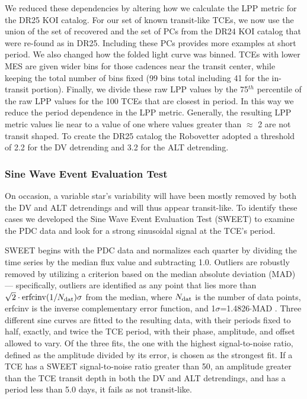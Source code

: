We reduced these dependencies by altering how we calculate the LPP metric for the DR25 KOI catalog. For our set of known transit-like TCEs, we now use the union of the set of recovered  and the set of PCs from the DR24 KOI catalog \citep{Coughlin2016} that were re-found as  in DR25. Including these PCs provides more examples at short period. We also changed how the folded light curve was binned. TCEs with lower MES are given wider bins for those cadences near the transit center, while keeping the total number of bins fixed (99 bins total including 41 for the in-transit portion). Finally, we divide these raw LPP values by the 75$^{th}$ percentile of the raw LPP values for the 100 TCEs that are closest in period.  In this way we reduce the period dependence in the LPP metric.  Generally, the resulting LPP metric values lie near to a value of one where values greater than $\approx$ 2 are not transit shaped.  To create the DR25 catalog the Robovetter adopted a threshold of 2.2 for the DV detrending and 3.2 for the ALT detrending.





\subsubsection{Sine Wave Event Evaluation Test}
\label{s:sweetntl}

On occasion, a variable star's variability will have been mostly removed by both the DV and ALT detrendings and will thus appear transit-like. To identify these cases we developed the Sine Wave Event Evaluation Test (SWEET) to examine the PDC data and look for a strong sinusoidal signal at the TCE's period. 

SWEET begins with the PDC data and normalizes each quarter by dividing the time series by the median flux value and subtracting 1.0. Outliers are robustly removed by utilizing a criterion based on the median absolute deviation (MAD) --- specifically, outliers are identified as any point that lies more than $\sqrt{2}\cdot\mathrm{erfcinv}(1/N_{\rm dat})\sigma$ from the median, where $N_{\rm dat}$ is the number of data points, erfcinv is the inverse complementary error function, and 1$\sigma$=1.4826$\cdot$MAD \citep[see][]{Hampel1974,Ruppert2010}. Three different sine curves are fitted to the resulting data, with their periods fixed to half, exactly, and twice the TCE period, with their phase, amplitude, and offset allowed to vary. Of the three fits, the one with the highest signal-to-noise ratio, defined as the amplitude divided by its error, is chosen as the strongest fit. If a TCE has a SWEET signal-to-noise ratio greater than 50, an amplitude greater than the TCE transit depth in both the DV and ALT detrendings, and has a period less than 5.0 days, it fails as not transit-like.

